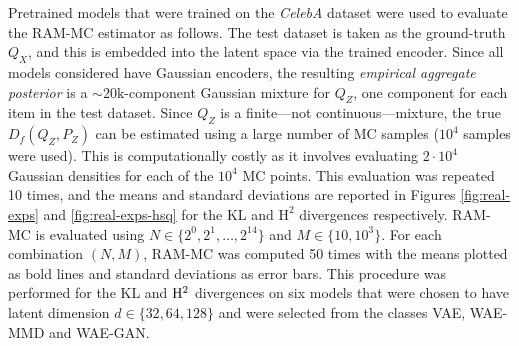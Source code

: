 Pretrained models that were trained on the \emph{CelebA} dataset \citep{liu2015faceattributes} were used to evaluate the RAM-MC estimator as follows.
The test dataset is taken as the ground-truth $Q_X$, and this is embedded into the latent space via the trained encoder.
Since all models considered have Gaussian encoders, the resulting \emph{empirical aggregate posterior}
is a ${\sim}{20}\text{k}$-component Gaussian mixture for $Q_Z$, one component for each item in the test dataset. 
Since $Q_Z$ is a finite---not continuous---mixture, the true $D_f(Q_Z,P_Z)$ can be estimated using a large number of MC samples ($10^4$ samples were used).
This is computationally costly as it involves evaluating $2\cdot 10^4$ Gaussian densities for each of the $10^4$ MC points.
This evaluation was repeated 10 times, and the means and standard deviations are reported in Figures \ref{fig:real-exps} and \ref{fig:real-exps-hsq} for the KL and $\mathrm{H}^2$ divergences respectively.
RAM-MC is evaluated using $N \in \{2^0, 2^1,\ldots, 2^{14}\}$ and $M \in \{10, 10^3\}$.
For each combination $(N,M)$, RAM-MC was computed 50 times with the means plotted as bold lines and standard deviations as error bars.
This procedure was performed for the KL and $\mathrm{H}^2$ divergences on six models that were chosen to have latent dimension $d\in\{32, 64, 128\}$ and were selected from the classes VAE, WAE-MMD and WAE-GAN.



